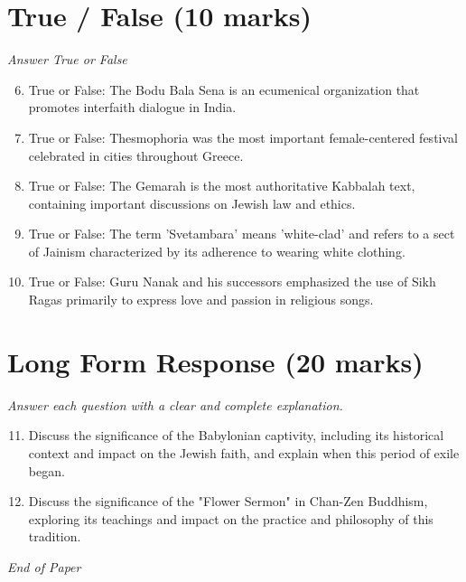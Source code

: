 \documentclass[12pt]{article}
\begin{document}
\section*{True / False (10 marks)}
\textit{Answer True or False}
\begin{enumerate}[label=\arabic*.]
\setcounter{enumi}{5}
\item True or False: The Bodu Bala Sena is an ecumenical organization that promotes interfaith dialogue in India.
\item True or False: Thesmophoria was the most important female-centered festival celebrated in cities throughout Greece.
\item True or False: The Gemarah is the most authoritative Kabbalah text, containing important discussions on Jewish law and ethics.
\item True or False: The term 'Svetambara' means 'white-clad' and refers to a sect of Jainism characterized by its adherence to wearing white clothing.
\item True or False: Guru Nanak and his successors emphasized the use of Sikh Ragas primarily to express love and passion in religious songs.
\end{enumerate}

\section*{Long Form Response (20 marks)}
\textit{Answer each question with a clear and complete explanation.}
\begin{enumerate}[label=\arabic*.]
\setcounter{enumi}{10}
\item Discuss the significance of the Babylonian captivity, including its historical context and impact on the Jewish faith, and explain when this period of exile began.
\item Discuss the significance of the "Flower Sermon" in Chan-Zen Buddhism, exploring its teachings and impact on the practice and philosophy of this tradition.
\end{enumerate}

\vfill
\noindent\textit{End of Paper}
\end{document}
